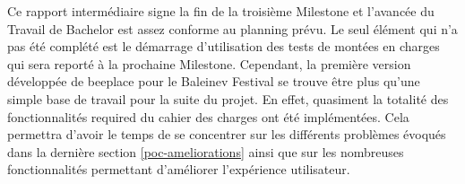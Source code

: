Ce rapport intermédiaire signe la fin de la troisième Milestone et l'avancée du Travail de Bachelor est assez conforme au planning prévu. Le seul élément qui n'a pas été complété est le démarrage d'utilisation des tests de montées en charges qui sera reporté à la prochaine Milestone. Cependant, la première version développée de \gls{beeplace} pour le Baleinev Festival se trouve être plus qu'une simple base de travail pour la suite du projet. En effet, quasiment la totalité des fonctionnalités \guillemotleft{} required \guillemotright{} du cahier des charges ont été implémentées. Cela permettra d'avoir le temps de se concentrer sur les différents problèmes évoqués dans la dernière section \ref{poc-ameliorations} ainsi que sur les nombreuses fonctionnalités permettant d'améliorer l'expérience utilisateur.

\vfil
\hspace{8cm}\makeatletter\@author\makeatother\par
\hspace{8cm}\begin{minipage}{5cm}
\end{minipage}